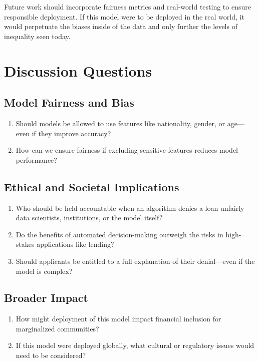 \documentclass[12pt]{article}
\begin{document}
	Future work should incorporate fairness metrics and real-world testing to ensure responsible deployment. If this model were to be deployed in the real world, it would perpetuate the biases inside of the data and only further the levels of inequality seen today.
	
	\pagebreak
	\section{Discussion Questions}
	
	\subsection*{Model Fairness and Bias}
	\begin{enumerate}
		\item Should models be allowed to use features like nationality, gender, or age—even if they improve accuracy?
		\item How can we ensure fairness if excluding sensitive features reduces model performance?
	\end{enumerate}
	
	\subsection*{Ethical and Societal Implications}
	\begin{enumerate}
		\item Who should be held accountable when an algorithm denies a loan unfairly—data scientists, institutions, or the model itself?
		\item Do the benefits of automated decision-making outweigh the risks in high-stakes applications like lending?
		\item Should applicants be entitled to a full explanation of their denial—even if the model is complex?
	\end{enumerate}
	
	\subsection*{Broader Impact}
	\begin{enumerate}
		\item How might deployment of this model impact financial inclusion for marginalized communities?
		\item If this model were deployed globally, what cultural or regulatory issues would need to be considered?
	\end{enumerate}
	
\end{document}
